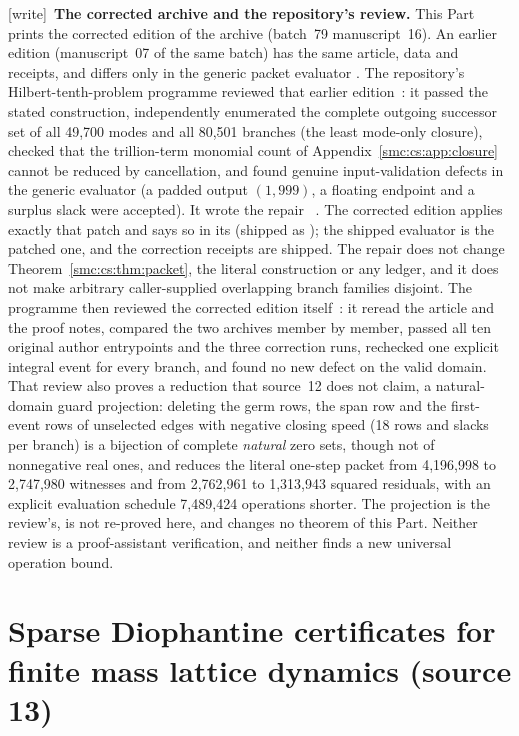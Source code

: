 \documentclass[11pt,letterpaper]{article}
\numberwithin{equation}{section}
\theoremstyle{definition}
\theoremstyle{remark}
\newcommand{\wtag}{\textup{[write]}}
\begin{document}
\wtag\ \textbf{The corrected archive and the repository's review.} This Part prints the corrected edition of the archive (batch~79 manuscript~16). An earlier edition (manuscript~07 of the same batch) has the same article, data and receipts, and differs only in the generic packet evaluator . The repository's Hilbert-tenth-problem programme reviewed that earlier edition~\cite{reviewcs}: it passed the stated construction, independently enumerated the complete outgoing successor set of all 49,700 modes and all 80,501 branches (the least mode-only closure), checked that the trillion-term monomial count of Appendix~\ref{smc:cs:app:closure} cannot be reduced by cancellation, and found genuine input-validation defects in the generic evaluator (a padded output $(1,999)$, a floating endpoint and a surplus slack were accepted). It wrote the repair ~\cite{reviewcs}. The corrected edition applies exactly that patch and says so in its  (shipped as ); the shipped evaluator  is the patched one, and the correction receipts are shipped. The repair does not change Theorem~\ref{smc:cs:thm:packet}, the literal construction or any ledger, and it does not make arbitrary caller-supplied overlapping branch families disjoint. The programme then reviewed the corrected edition itself~\cite{reviewcsc}: it reread the article and the proof notes, compared the two archives member by member, passed all ten original author entrypoints and the three correction runs, rechecked one explicit integral event for every branch, and found no new defect on the valid domain. That review also proves a reduction that source~12 does not claim, a natural-domain guard projection: deleting the germ rows, the span row and the first-event rows of unselected edges with negative closing speed (18 rows and slacks per branch) is a bijection of complete \emph{natural} zero sets, though not of nonnegative real ones, and reduces the literal one-step packet from 4,196,998 to 2,747,980 witnesses and from 2,762,961 to 1,313,943 squared residuals, with an explicit evaluation schedule 7,489,424 operations shorter. The projection is the review's, is not re-proved here, and changes no theorem of this Part. Neither review is a proof-assistant verification, and neither finds a new universal operation bound.

\part{Sparse Diophantine certificates for finite mass lattice dynamics (source 13)}\label{smc:sl:part}
\end{document}
